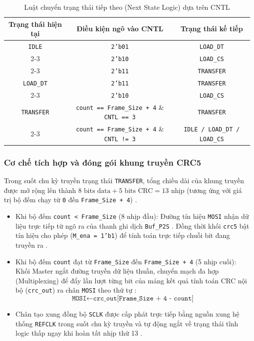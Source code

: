 \begin{table}[h!]
\centering
\caption{Luật chuyển trạng thái tiếp theo (Next State Logic) dựa trên CNTL}
\label{tab:fsm_master}
\begin{tabular}{|c|c|c|}
\hline
\textbf{Trạng thái hiện tại} & \textbf{Điều kiện ngõ vào CNTL} & \textbf{Trạng thái kế tiếp} \\ \hline
\texttt{IDLE} & \texttt{2'b01} & \texttt{LOAD\_DT}  \\ \cline{2-3} 
 & \texttt{2'b10} & \texttt{LOAD\_CS}  \\ \cline{2-3} 
 & \texttt{2'b11} & \texttt{TRANSFER}  \\ \hline
\texttt{LOAD\_DT} & \texttt{2'b11} & \texttt{TRANSFER}  \\ \cline{2-3} 
 & \texttt{2'b10} & \texttt{LOAD\_CS}  \\ \hline
\texttt{TRANSFER} & \texttt{count == Frame\_Size + 4} \& \texttt{CNTL == 3} & \texttt{TRANSFER}  \\ \cline{2-3} 
 & \texttt{count == Frame\_Size + 4} \& \texttt{CNTL != 3} & \texttt{IDLE / LOAD\_DT / LOAD\_CS}  \\ \hline
\end{tabular}
\end{table}

\subsubsection{Cơ chế tích hợp và đóng gói khung truyền CRC5}
Trong suốt chu kỳ truyền trạng thái \texttt{TRANSFER}, tổng chiều dài của khung truyền được mở rộng lên thành $8 \text{ bits data} + 5 \text{ bits CRC} = 13 \text{ nhịp}$ (tương ứng với giá trị bộ đếm chạy từ \texttt{0} đến \texttt{Frame\_Size + 4}) . 
\begin{itemize}
    \item Khi bộ đếm \texttt{count < Frame\_Size} (8 nhịp đầu): Đường tín hiệu \texttt{MOSI} nhận dữ liệu trực tiếp từ ngõ ra của thanh ghi dịch \texttt{Buf\_P2S} . Đồng thời khối \texttt{crc5} bật tín hiệu cho phép (\texttt{M\_ena = 1'b1}) để tính toán trực tiếp chuỗi bit đang truyền ra .
    \item Khi bộ đếm \texttt{count} đạt từ \texttt{Frame\_Size} đến \texttt{Frame\_Size + 4} (5 nhịp cuối): Khối Master ngắt đường truyền dữ liệu thuần, chuyển mạch đa hợp (Multiplexing) để đẩy lần lượt từng bit của mảng kết quả tính toán CRC nội bộ (\texttt{crc\_out}) ra chân \texttt{MOSI} theo thứ tự :
    \begin{equation}
        \texttt{MOSI} \leftarrow \texttt{crc\_out[Frame\_Size + 4 - count]} 
    \end{equation}
    \item Chân tạo xung đồng bộ \texttt{SCLK} được cấp phát trực tiếp bằng nguồn xung hệ thống \texttt{REFCLK} trong suốt chu kỳ truyền và tự động ngắt về trạng thái tĩnh logic thấp ngay khi hoàn tất nhịp thứ 13 .
\end{itemize}

